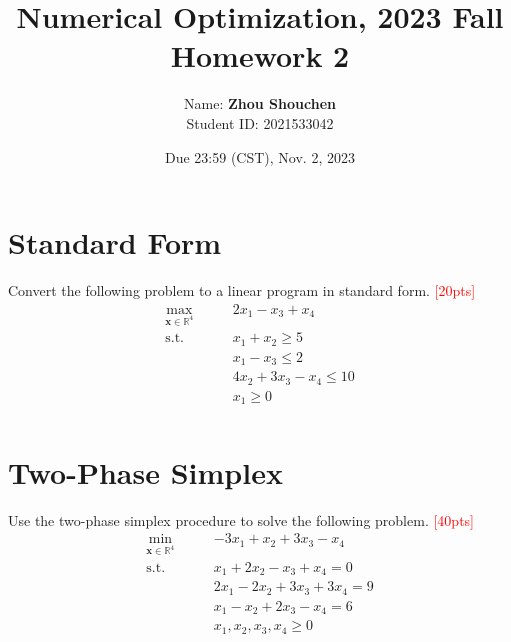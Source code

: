 \documentclass[10pt]{article}
\begin{document}
\title{	Numerical Optimization, 2023 Fall\\Homework 2}
\date{Due 23:59 (CST), Nov. 2, 2023 }

\author{
    Name: \textbf{Zhou Shouchen} \\
	Student ID: 2021533042
}

\maketitle

\newpage

\section{Standard Form}
Convert the following problem to a linear program in standard form. \textcolor{red}{[20pts]}~
\begin{equation}
	\begin{aligned}
		\max_{\bm{x} \in \mathbb{R}^{4}}\qquad & 2x_{1} - x_{3} + x_{4} \\
		\mathrm{s.t.}\qquad & x_{1} + x_{2} \geq 5 \\
							& x_{1} - x_{3} \leq 2 \\
                                & 4x_{2} + 3x_{3} - x_{4} \leq 10 \\
                                & x_{1} \geq 0 \\
	\end{aligned}
\end{equation}

\newpage

\section{Two-Phase Simplex}
Use the two-phase simplex procedure to solve the following problem. \textcolor{red}{[40pts]}
\begin{equation}
	\begin{aligned}
		\min_{\bm{x} \in \mathbb{R}^{4}}\qquad & -3x_{1} + x_{2} + 3x_{3} - x_{4} \\
		\mathrm{s.t.}\qquad & x_{1} + 2x_{2} - x_{3} + x_{4} = 0 \\
							  & 2x_{1} - 2x_{2} + 3x_{3} + 3x_{4} = 9 \\
							  & x_{1} - x_{2} + 2x_{3} - x_{4} = 6 \\
							  & x_{1}, x_{2}, x_{3}, x_{4} \geq 0 \\
	\end{aligned}
\end{equation}
\end{document}
